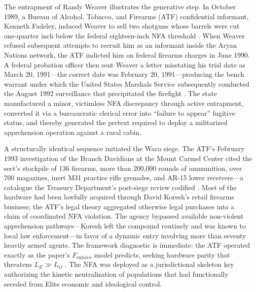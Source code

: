 The entrapment of Randy Weaver illustrates the generative step. In October 1989, a Bureau of Alcohol, Tobacco, and Firearms (ATF) confidential informant, Kenneth Fadeley, induced Weaver to sell two shotguns whose barrels were cut one-quarter inch below the federal eighteen-inch NFA threshold \cite{dojruby1994}. When Weaver refused subsequent attempts to recruit him as an informant inside the Aryan Nations network, the ATF indicted him on federal firearms charges in June 1990. A federal probation officer then sent Weaver a letter misstating his trial date as March 20, 1991---the correct date was February 20, 1991---producing the bench warrant under which the United States Marshals Service subsequently conducted the August 1992 surveillance that precipitated the firefight \cite{dojruby1994, oprruby2001}. The state manufactured a minor, victimless NFA discrepancy through active entrapment, converted it via a bureaucratic clerical error into ``failure to appear'' fugitive status, and thereby generated the pretext required to deploy a militarized apprehension operation against a rural cabin.

A structurally identical sequence initiated the Waco siege. The ATF's February 1993 investigation of the Branch Davidians at the Mount Carmel Center cited the sect's stockpile of 136 firearms, more than 200{,}000 rounds of ammunition, over 700 magazines, inert M31 practice rifle grenades, and AR-15 lower receivers---a catalogue the Treasury Department's post-siege review codified \cite{treasury1993waco, danforth2000}. Most of the hardware had been lawfully acquired through David Koresh's retail firearms business; the ATF's legal theory aggregated otherwise legal purchases into a claim of coordinated NFA violation. The agency bypassed available non-violent apprehension pathways---Koresh left the compound routinely and was known to local law enforcement---in favor of a dynamic entry involving more than seventy heavily armed agents. The framework diagnostic is immediate: the ATF operated exactly as the paper's $F_{\text{enforce}}$ model predicts, seeking hardware parity that threatens $L_E \gg L_O$ \cite{treasury1993waco}. The NFA was deployed as a jurisdictional skeleton key authorizing the kinetic neutralization of populations that had functionally seceded from Elite economic and ideological control.

